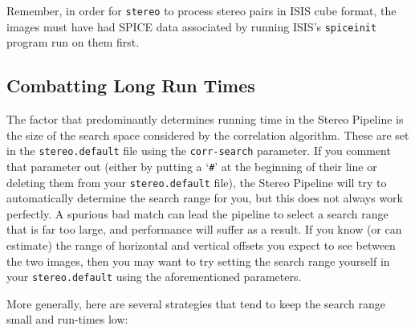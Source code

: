 Remember, in order for \texttt{stereo} to process stereo pairs in
\ac{ISIS} cube format, the images must have had SPICE data associated
by running ISIS's \texttt{spiceinit} program run on them first.

\subsection{Combatting Long Run Times}

The factor that predominantly determines running time in the Stereo
Pipeline is the size of the search space considered by the correlation
algorithm.  These are set in the \texttt{stereo.default} file using
the \texttt{corr-search} parameter.  If you comment that parameter out
(either by putting a `\texttt{\#}' at the beginning of their line or
deleting them from your \texttt{stereo.default} file), the Stereo
Pipeline will try to automatically determine the search range for you,
but this does not always work perfectly.  A spurious bad match can
lead the pipeline to select a search range that is far too large, and
performance will suffer as a result.  If you know (or can estimate)
the range of horizontal and vertical offsets you expect to see between
the two images, then you may want to try setting the search range
yourself in your \texttt{stereo.default} using the aforementioned
parameters.

More generally, here are several strategies that tend to keep the
search range small and run-times low:

